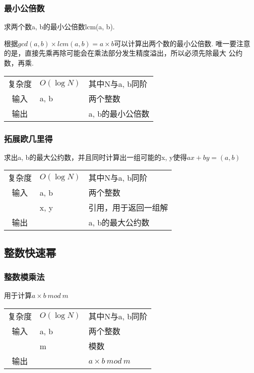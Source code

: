         \subsubsection{最小公倍数}\small
求两个数a, b的最小公倍数lcm(a, b).

根据$gcd(a, b) \times lcm(a, b) = a \times b$可以计算出两个数的最小公倍数.
唯一要注意的是，直接先乘再除可能会在乘法部分发生精度溢出，所以必须先除最大
公约数，再乘.
\begin{longtable}{|c|l|l|}
复杂度 & $O(\log N)$ & 其中N与a, b同阶  \\
输入 & a, b & 两个整数 \\
输出 &  & a, b的最小公倍数 \\
\end{longtable}



        \subsubsection{拓展欧几里得}\small
求出a, b的最大公约数，并且同时计算出一组可能的x, y使得$ax + by = (a, b)$
\begin{longtable}{|c|l|l|}
复杂度 & $O(\log N)$ & 其中N与a, b同阶  \\
输入 & a, b & 两个整数 \\
 & x, y & 引用，用于返回一组解 \\
输出 &  & a, b的最大公约数 \\
\end{longtable}



    \subsection{整数快速幂}\small
        \subsubsection{整数模乘法}\small
用于计算$a \times b \ mod\ m$
\begin{longtable}{|c|l|l|}
复杂度 & $O(\log N)$ & 其中N与a, b同阶  \\
输入 & a, b & 两个整数 \\
 & m & 模数 \\
输出 &  & $a \times b \ mod\ m$ \\
\end{longtable}



